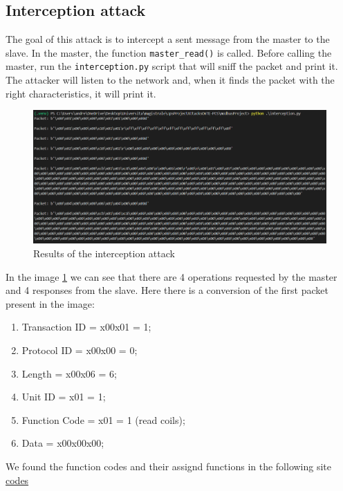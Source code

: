 \documentclass[12pt]{article}
\begin{document}
\subsection{Interception attack}
The goal of this attack is to intercept a sent message from the master to the slave. In the master, the function \texttt{master\_read()} is called. Before calling the master, run the \texttt{interception.py} script that will sniff the packet and print it. 
The attacker will listen to the network and, when it finds the packet with the right characteristics, 
it will print it.
\begin{figure}[h]
    \centering
    \includegraphics[width=1\textwidth]{images/InterceptionResults.png}
    \caption{Results of the interception attack}
    \label{fig:interceptionResult}
\end{figure}
In the image \ref{fig:interceptionResult} we can see that there are 4 operations requested by the master and 4 responses from the slave.
Here there is a conversion of the first packet present in the image:
\begin{enumerate}
    \item Transaction ID = x00x01 = 1;
    \item Protocol ID = x00x00 = 0;
    \item Length = x00x06 = 6;
    \item Unit ID = x01 = 1;
    \item Function Code = x01 = 1 (read coils);
    \item Data = x00x00x00;
\end{enumerate}
We found the function codes and their assignd functions in the following site \href{https://ozeki.hu/p_5873-modbus-function-codes.html}{codes}
\end{document}
